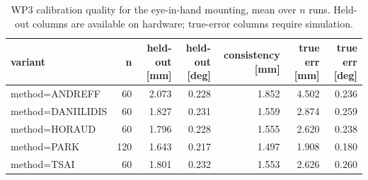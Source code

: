 \begin{table}[htbp]
  \centering
  \caption{WP3 calibration quality for the eye-in-hand mounting, mean over $n$ runs. Held-out columns are available on hardware; true-error columns require simulation.}
  \label{tab:wp3-summary-eye-in-hand}
  \begin{tabular}{lrrrrrr}
    \toprule
    variant & n & held-out [mm] & held-out [deg] & consistency [mm] & true err [mm] & true err [deg] \\
    \midrule
    method=ANDREFF & 60 & 2.073 & 0.228 & 1.852 & 4.502 & 0.236 \\
    method=DANIILIDIS & 60 & 1.827 & 0.231 & 1.559 & 2.874 & 0.259 \\
    method=HORAUD & 60 & 1.796 & 0.228 & 1.555 & 2.620 & 0.238 \\
    method=PARK & 120 & 1.643 & 0.217 & 1.497 & 1.908 & 0.180 \\
    method=TSAI & 60 & 1.801 & 0.232 & 1.553 & 2.626 & 0.260 \\
    \bottomrule
  \end{tabular}
\end{table}
